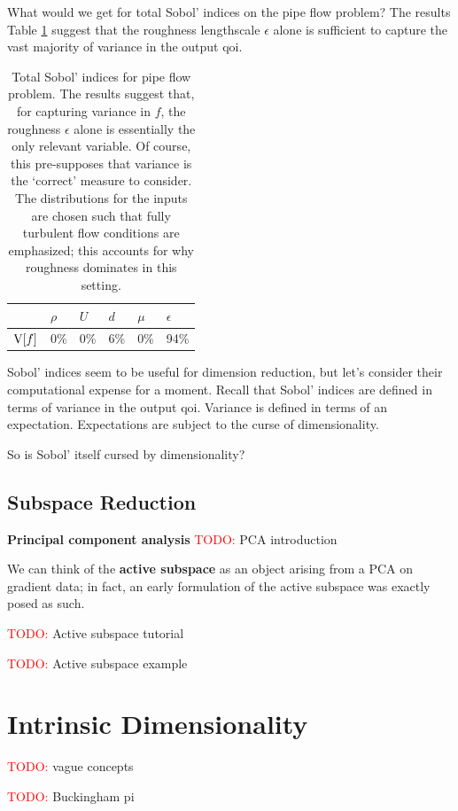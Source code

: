 \documentclass{article}
\begin{document}
What would we get for total Sobol' indices on the pipe flow problem? The results
Table \ref{tab:pipe-sobol} suggest that the roughness lengthscale $\epsilon$
alone is sufficient to capture the vast majority of variance in the output qoi.

\begin{table}[!ht]
  \centering
  \begin{tabular}{@{}llllll@{}}
   & $\rho$ & $U$ & $d$ & $\mu$ & $\epsilon$\\
  \hline
  $\mathrm{V}[f]$ & 0\% & 0\% & 6\% & 0\% & 94\% \\
  \end{tabular}
  \caption{Total Sobol' indices for pipe flow problem. The results suggest that,
    for capturing variance in $f$, the roughness $\epsilon$ alone is essentially
    the only relevant variable. Of course, this pre-supposes that variance is
    the `correct' measure to consider. The distributions for the inputs are
    chosen such that fully turbulent flow conditions are emphasized; this
    accounts for why roughness dominates in this setting.}
  \label{tab:pipe-sobol}
\end{table}

Sobol' indices seem to be useful for dimension reduction, but let's consider
their computational expense for a moment. Recall that Sobol' indices are defined
in terms of variance in the output qoi. Variance is defined in terms of an
expectation. Expectations are subject to the curse of dimensionality.

So is Sobol' itself cursed by dimensionality?



\subsection{Subspace Reduction}
\textbf{Principal component analysis} \textcolor{red}{TODO:} PCA introduction

We can think of the \textbf{active subspace} as an object arising from a PCA on
gradient data; in fact, an early formulation of the active subspace was exactly
posed as such.\cite{russi2010uncertainty}

\textcolor{red}{TODO:} Active subspace tutorial

\textcolor{red}{TODO:} Active subspace example

\section{Intrinsic Dimensionality}

\textcolor{red}{TODO:} vague concepts

\textcolor{red}{TODO:} Buckingham pi



\end{document}
